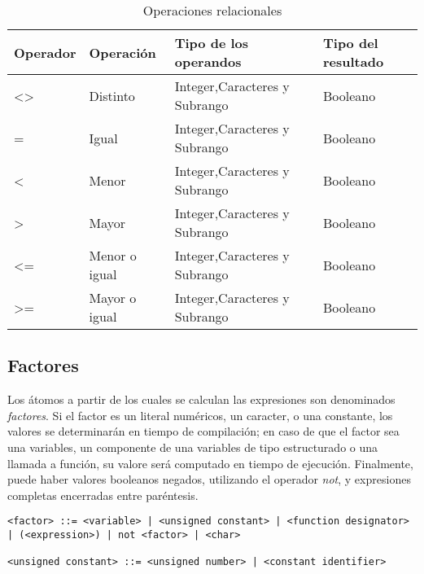 \documentclass[a4paper,oneside]{report}
\begin{document}
\begin{table}[htbp]
  \centering
  
    \begin{tabular}{|l|l|l|l|}
    \hline
    \textbf{Operador} & \textbf{Operación} & \textbf{Tipo de los operandos }& \textbf{Tipo del resultado} \\
    \hline
    \textless \textgreater    & Distinto & Integer,Caracteres y Subrango & Booleano \\
    \hline
    =     & Igual & Integer,Caracteres y Subrango & Booleano \\
    \hline
    \textless     & Menor & Integer,Caracteres y Subrango & Booleano \\
    \hline
    \textgreater     & Mayor & Integer,Caracteres y Subrango & Booleano \\
    \hline
    \textless=    & Menor o igual & Integer,Caracteres y Subrango & Booleano \\
    \hline
    \textgreater=    & Mayor o igual & Integer,Caracteres y Subrango & Booleano \\
    \hline
    
    \end{tabular}%
  \label{tab:oprel}%
  \caption{Operaciones relacionales}
\end{table}%



\subsection{Factores}

Los átomos a partir de los cuales se calculan las expresiones son denominados \textsl{factores}. Si el factor es un literal numéricos, un caracter, o una constante, los valores se determinarán en tiempo de compilación; en caso de que el factor sea una variables, un componente de una variables de tipo estructurado o una llamada a función, su valore será computado en tiempo de ejecución. Finalmente, puede haber valores booleanos negados, utilizando el operador \textsl{not}, y expresiones completas encerradas entre paréntesis.

\begin{verbatim}
<factor> ::= <variable> | <unsigned constant> | <function designator> | (<expression>) | not <factor> | <char>

<unsigned constant> ::= <unsigned number> | <constant identifier>
\end{verbatim}
\end{document}
